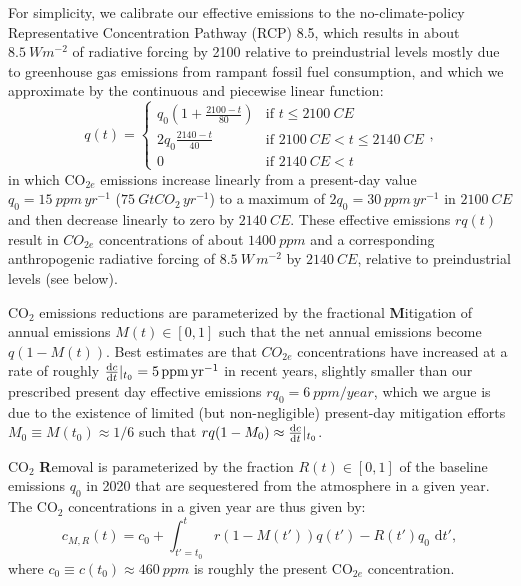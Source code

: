 \documentclass{article}
\begin{document}
For simplicity, we calibrate our effective emissions to the no-climate-policy Representative Concentration Pathway (RCP) 8.5, which results in about $\SI{8.5}{W m^{-2}}$ of radiative forcing by 2100 relative to preindustrial levels mostly due to greenhouse gas emissions from rampant fossil fuel consumption, and which we approximate by the continuous and piecewise linear function:
\begin{equation}
    q(t) = 
    \begin{cases}
        q_{0}(1 + \frac{2100-t}{80}) &\mbox{if } t \le \SI{2100}{CE} \\
        2q_{0}\frac{2140-t}{40} &\mbox{if } \SI{2100}{CE} < t \le \SI{2140}{CE} \\
        0 &\mbox{if } \SI{2140}{CE} < t
    \end{cases},\label{eq.baseline_emissions}
\end{equation}
in which CO$_{2e}$ emissions increase linearly from a present-day value $q_{0} = \SI{15}{ppm\, yr^{-1}}$ ($\SI{75}{GtCO_{2}\, yr^{-1}}$) to a maximum of $2q_{0} = \SI{30}{ppm\, yr^{-1}}$ in $\SI{2100}{CE}$ and then decrease linearly to zero by $\SI{2140}{CE}$. These effective emissions $rq(t)$ result in $CO_{2e}$ concentrations of about $\SI{1400}{ppm}$ and a corresponding anthropogenic radiative forcing of $\SI{8.5}{W\, m^{-2}}$ by $\SI{2140}{CE}$, relative to preindustrial levels (see below).

CO$_{2}$ emissions reductions are parameterized by the fractional \textbf{M}itigation of annual emissions $M(t) \in [0,1]$ such that the net annual emissions become $q(1-M(t))$. Best estimates are that $CO_{2e}$ concentrations have increased at a rate of roughly $\dv{c}{t}|_{t_{0}} = \SI{5}{ppm\, yr^{-1}}$ in recent years, slightly smaller than our prescribed present day effective emissions $rq_{0}= \SI{6}{ppm/year}$, which we argue is due to the existence of limited (but non-negligible) present-day mitigation efforts $M_{0} \equiv M(t_{0}) \approx 1/6$ such that $rq(1-M_{0}) \approx \dv{c}{t}|_{t_{0}}$.

CO$_{2}$ \textbf{R}emoval is parameterized by the fraction $R(t) \in [0,1]$ of the baseline emissions $q_{0}$ in 2020 that are sequestered from the atmosphere in a given year. The CO$_{2}$ concentrations in a given year are thus given by:
\begin{equation}
    c_{M, R}(t) = c_{0} + \int_{t'=t_{0}}^{t} r(1-M(t'))q(t') - R(t')q_{0} \text{ d}t'\label{eq-CO2-conc},
\end{equation}
where $c_{0} \equiv c(t_{0}) \approx \SI{460}{ppm}$ is roughly the present CO$_{2e}$ concentration.
\end{document}
